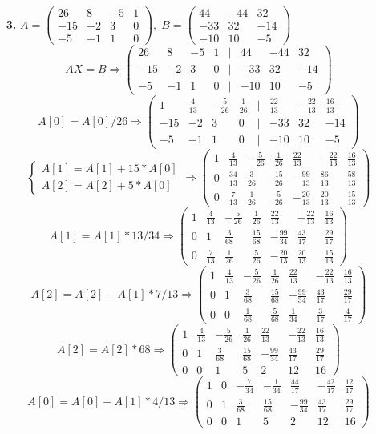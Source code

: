 \documentclass[a4paper]{article}
\newcommand{\mat}[1]{\begin{pmatrix} #1 \end{pmatrix}}
\newcommand{\case}[1]{\begin{cases} #1 \end{cases}}
\renewcommand{\r}{\Rightarrow}
\begin{document}
\begin{enumerate}
    \item[\textbf{3.}]$A = \mat{26 & 8 & -5 & 1 \\ -15 & -2 &3 & 0 \\ -5 & -1 & 1 & 0}, \; B = \mat{44 & -44 & 32 \\ -33 & 32 & -14 \\ -10 & 10 & -5}$
    {\small
    $$AX = B \r \mat{26 & 8 & -5 & 1 & | & 44 & -44 & 32 \\ -15 & -2 &3 & 0 & | & -33 & 32 & -14 \\ -5 & -1 & 1 & 0 & | & -10 & 10 & -5}$$
    $$A[0] = A[0]/26 \r \mat{1 & \frac{4}{13} & -\frac{5}{26} & \frac{1}{26} & | & \frac{22}{13} & -\frac{22}{13} & \frac{16}{13} \\ -15 & -2 & 3 & 0 & | & -33 & 32 & -14 \\ -5 & -1 & 1 & 0 & | & -10 & 10 & -5}$$
    $$\case{A[1] = A[1]+15*A[0]\\A[2] = A[2]+5*A[0]} \r \mat{1 & \frac{4}{13} & -\frac{5}{26} & \frac{1}{26} & \frac{22}{13} & -\frac{22}{13} & \frac{16}{13} \\ 0 & \frac{34}{13} & \frac{3}{26} & \frac{15}{26} & -\frac{99}{13} & \frac{86}{13} & \frac{58}{13} \\ 0 & \frac{7}{13} & \frac{1}{26} & \frac{5}{26} & -\frac{20}{13} & \frac{20}{13} & \frac{15}{13}}$$
    $$A[1] = A[1]*13/34 \r \mat{1 & \frac{4}{13} & -\frac{5}{26} & \frac{1}{26} & \frac{22}{13} & -\frac{22}{13} & \frac{16}{13} \\ 0 & 1 & \frac{3}{68} & \frac{15}{68} & -\frac{99}{34} & \frac{43}{17} & \frac{29}{17} \\ 0 & \frac{7}{13} & \frac{1}{26} & \frac{5}{26} & -\frac{20}{13} & \frac{20}{13} & \frac{15}{13}}$$
    $$A[2] = A[2]-A[1]*7/13 \r \mat{1 & \frac{4}{13} & -\frac{5}{26} & \frac{1}{26} & \frac{22}{13} & -\frac{22}{13} & \frac{16}{13} \\ 0 & 1 & \frac{3}{68} & \frac{15}{68} & -\frac{99}{34} & \frac{43}{17} & \frac{29}{17} \\ 0 & 0 & \frac{1}{68} & \frac{5}{68} & \frac{1}{34} & \frac{3}{17} & \frac{4}{17}}$$
    $$A[2] = A[2]*68 \r \mat{1 & \frac{4}{13} & -\frac{5}{26} & \frac{1}{26} & \frac{22}{13} & -\frac{22}{13} & \frac{16}{13} \\ 0 & 1 & \frac{3}{68} & \frac{15}{68} & -\frac{99}{34} & \frac{43}{17} & \frac{29}{17} \\ 0 & 0 & 1 & 5 & 2 & 12 & 16}$$
    $$A[0] = A[0]-A[1]*4/13 \r \mat{1 & 0 & -\frac{7}{34} & -\frac{1}{34} & \frac{44}{17} & -\frac{42}{17} & \frac{12}{17} \\ 0 & 1 & \frac{3}{68} & \frac{15}{68} & -\frac{99}{34} & \frac{43}{17} & \frac{29}{17} \\ 0 & 0 & 1 & 5 & 2 & 12 & 16}$$
}
\end{enumerate}
\end{document}
